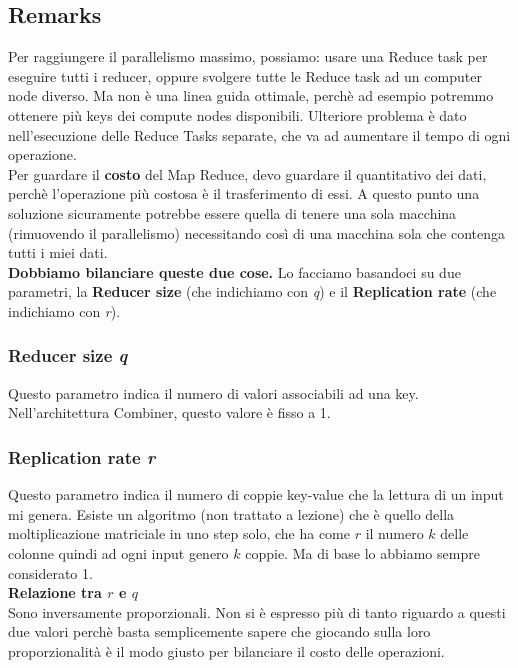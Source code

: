 \subsection{Remarks}
Per raggiungere il parallelismo massimo, possiamo: usare una Reduce task per eseguire tutti i reducer, oppure svolgere tutte le Reduce task ad un computer node diverso. Ma non è una linea guida ottimale, perchè ad esempio potremmo ottenere più keys dei compute nodes disponibili. Ulteriore problema è dato nell'esecuzione delle Reduce Tasks separate, che va ad aumentare il tempo di ogni operazione. 
\\
Per guardare il \textbf{costo} del Map Reduce, devo guardare il quantitativo dei dati, perchè l'operazione più costosa è il trasferimento di essi. A questo punto una soluzione sicuramente potrebbe essere quella di tenere una sola macchina (rimuovendo il parallelismo) necessitando così di una macchina sola che contenga tutti i miei dati. 
\\
\textbf{Dobbiamo bilanciare queste due cose.} Lo facciamo basandoci su due parametri, la \textbf{Reducer size} (che indichiamo con \textit{q}) e il \textbf{Replication rate} (che indichiamo con \textit{r}).
\subsubsection{Reducer size \textit{q}}
Questo parametro indica il numero di valori associabili ad una key. Nell'architettura Combiner, questo valore è fisso a 1.
\subsubsection{Replication rate \textit{r}}
Questo parametro indica il numero di coppie key-value che la lettura di un input mi genera. Esiste un algoritmo (non trattato a lezione) che è quello della moltiplicazione matriciale in uno step solo, che ha come $r$ il numero $k$ delle colonne quindi ad ogni input genero $k$ coppie. Ma di base lo abbiamo sempre considerato 1. 
\\[2ex]
\textbf{\large{Relazione tra $r$ e $q$}}
\\[2ex]
Sono inversamente proporzionali. Non si è espresso più di tanto riguardo a questi due valori perchè basta semplicemente sapere che giocando sulla loro proporzionalità è il modo giusto per bilanciare il costo delle operazioni. 
